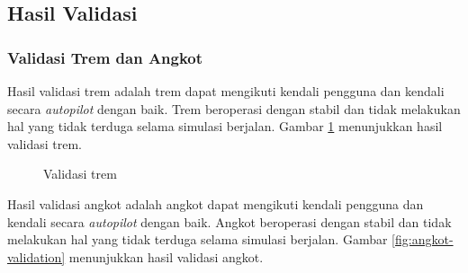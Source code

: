 \subsection{Hasil Validasi}


\subsubsection{Validasi Trem dan Angkot}

Hasil validasi trem adalah trem dapat mengikuti kendali pengguna dan kendali
secara \textit{autopilot} dengan baik. Trem beroperasi dengan stabil dan tidak
melakukan hal yang tidak terduga selama simulasi berjalan. Gambar
\ref{fig:tram-validation} menunjukkan hasil validasi trem.

\begin{figure}[!h]
    \centering
    \hfill
    \caption{Validasi trem}
    \label{fig:tram-validation}
\end{figure}

Hasil validasi angkot adalah angkot dapat mengikuti kendali pengguna dan kendali
secara \textit{autopilot} dengan baik. Angkot beroperasi dengan stabil dan tidak
melakukan hal yang tidak terduga selama simulasi berjalan. Gambar
\ref{fig:angkot-validation} menunjukkan hasil validasi angkot.

